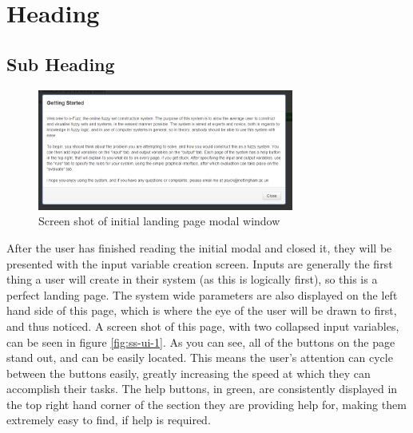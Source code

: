 \section{Heading}
\subsection{Sub Heading}



\begin{figure}[ht!]
	\centering %
	\includegraphics[width=0.75\textwidth]{images/ui-0} %
	\vspace{-2mm} %
	\caption{Screen shot of initial landing page modal window} %
	\label{fig:ss-ui-0} %
	\vspace{-1mm} %
\end{figure}

\noindent 
After the user has finished reading the initial modal and closed it, they will be presented with the input variable creation screen. Inputs are generally the first thing a user will create in their system (as this is logically first), so this is a perfect landing page. The system wide parameters are also displayed on the left hand side of this page, which is where the eye of the user will be drawn to first, and thus noticed. A screen shot of this page, with two collapsed input variables, can be seen in figure \ref{fig:ss-ui-1}. As you can see, all of the buttons on the page stand out, and can be easily located. This means the user's attention can cycle between the buttons easily, greatly increasing the speed at which they can accomplish their tasks. The help buttons, in green, are consistently displayed in the top right hand corner of the section they are providing help for, making them extremely easy to find, if help is required.

